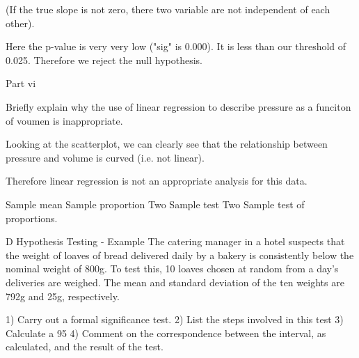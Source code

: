 (If the true slope is not zero, there two variable are not independent of each other).
 
Here the p-value is very very low ("sig"  is 0.000). It is less than our threshold of 0.025. Therefore we reject the null hypothesis.
 
Part vi
 
 
Briefly explain why the  use of linear regression to describe pressure as a funciton of voumen is inappropriate.
 
Looking at the scatterplot, we can clearly see that the relationship between pressure and volume is curved (i.e. not linear). 
 
Therefore linear regression is not an appropriate analysis for this data.
 
  
 

Sample mean
Sample proportion
Two Sample test
Two Sample test of proportions. 

D Hypothesis Testing - Example
The catering manager in a hotel suspects that the weight of loaves of bread delivered
daily by a bakery is consistently below the nominal weight of 800g. To test this,
10 loaves chosen at random from a day’s deliveries are weighed. The mean and
standard deviation of the ten weights are 792g and 25g, respectively.
 
1) Carry out a formal significance test.
2) List the steps involved in this test 
3) Calculate a 95%
4) Comment on the correspondence between the interval, as calculated, and the
    result of the test.
